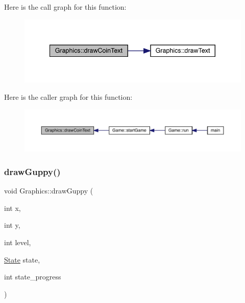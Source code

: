 Here is the call graph for this function\+:\nopagebreak
\begin{figure}[H]
\begin{center}
\leavevmode
\includegraphics[width=340pt]{class_graphics_adaecfa8fab0e04636cb575d7599494d6_cgraph}
\end{center}
\end{figure}
Here is the caller graph for this function\+:\nopagebreak
\begin{figure}[H]
\begin{center}
\leavevmode
\includegraphics[width=350pt]{class_graphics_adaecfa8fab0e04636cb575d7599494d6_icgraph}
\end{center}
\end{figure}
\mbox{\label{class_graphics_a35aa55c180a9f9be306b74906f710954}} 
\subsubsection{\texorpdfstring{draw\+Guppy()}{drawGuppy()}}
{\footnotesize\ttfamily void Graphics\+::draw\+Guppy (\begin{DoxyParamCaption}\item[{int}]{x,  }\item[{int}]{y,  }\item[{int}]{level,  }\item[{\mbox{\hyperlink{_constants_8hpp_a5d74787dedbc4e11c1ab15bf487e61f8}{State}}}]{state,  }\item[{int}]{state\+\_\+progress }\end{DoxyParamCaption})}


